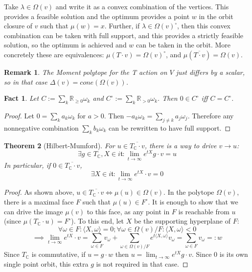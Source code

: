 \documentclass{article}
\newtheorem{theorem}{Theorem}
\newtheorem{fact}[theorem]{Fact}
\newtheorem{remark}{Remark}
\newcommand{\R}{{\mathbb{R}}}
\newcommand{\C}{{\mathbb{C}}}
\begin{document}
Take $\lambda \in \Omega(v)$ and write it as a convex combination of the vertices. This provides a feasible solution and the optimum provides a point $w$ in the orbit closure of $v$ such that $\mu(w) = x$. Further, if $\lambda \in \Omega(v)^{\circ}$, then this convex combination can be taken with full support, and this provides a strictly feasible solution, so the optimum is achieved and $w$ can be taken in the orbit. More concretely these are equivalences: $\mu(T \cdot v) = \Omega(v)^{\circ}$, and $\mu(\overline{T \cdot v}) = \Omega(v)$. 

\begin{remark}
The Moment polytope for the T action on $V$ just differs by a scalar, so in that case $\Delta(v) = cone(\Omega(v))$. 
\end{remark}

\begin{fact}
Let $C := \sum_{k} \R_{\geq 0} \omega_{k}$ and $C^{\circ} := \sum_{k} \R_{> 0} \omega_{k}$. Then $0 \in C^{\circ}$ iff $C = C^{\circ}$. 
\end{fact}
\begin{proof}
Let $0 = \sum_{k} a_{k} \omega_{k}$ for $a > 0$. Then $- a_{k} \omega_{k} = \sum_{j \neq k} a_{j} \omega_{j}$. Therefore any nonnegative combination $\sum_{k} b_{k} \omega_{k}$ can be rewritten to have full support. 
\end{proof}

\begin{theorem} [Hilbert-Mumford]
For $u \in \overline{T_{\C} \cdot v}$, there is a way to drive $v \to u$:
\[ \exists g \in T_{\C}, X \in i \mathfrak{t}: \lim_{t \to \infty} e^{tX} g \cdot v = u \]
In particular, if $0 \in \overline{T_{\C} \cdot v}$, 
\[ \exists X \in i \mathfrak{t}: \lim_{t \to \infty} e^{tX} \cdot v = 0 \]
\end{theorem}
\begin{proof}
As shown above, $u \in \overline{T_{\C} \cdot v} \iff \mu(u) \in \Omega(v)$. In the polytope $\Omega(v)$, there is a maximal face $F$ such that $\mu(u) \in F^{\circ}$. It is enough to show that we can drive the image $\mu(v)$ to this face, as any point in $F$ is reachable from $u$ (since $\mu(T_{\C} \cdot u) = F^{\circ}$). To this end, let $X$ be the supporting hyperplane of $F$:
\[ \forall \omega \in F: \langle X, \omega \rangle = 0; \forall \omega \in \Omega(v)/F: \langle X, \omega \rangle < 0  \]
\[ \implies \lim_{t \to \infty} e^{tX} \cdot v = \sum_{\omega \in F} v_{\omega} + \sum_{\omega \in \Omega(v)/F} e^{t \langle X, \omega \rangle} v_{\omega} = \sum_{\omega \in F} v_{\omega} =: w \]
Since $T_{\C}$ is commutative, if $u = g \cdot w$ then $u = \lim_{t \to \infty} e^{tX} g \cdot v$. Since $0$ is its own single point orbit, this extra $g$ is not required in that case. 
\end{proof}
\end{document}
